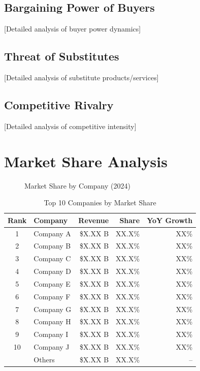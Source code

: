 \documentclass[11pt,letterpaper]{report}
\begin{document}
\subsection{Bargaining Power of Buyers}
[Detailed analysis of buyer power dynamics]

\subsection{Threat of Substitutes}
[Detailed analysis of substitute products/services]

\subsection{Competitive Rivalry}
[Detailed analysis of competitive intensity]

\section{Market Share Analysis}


\begin{figure}[htbp]
\centering
\caption{Market Share by Company (2024)}
\label{fig:market_share}
\end{figure}

\begin{table}[htbp]
\centering
\caption{Top 10 Companies by Market Share}
\begin{tabular}{@{}clrrr@{}}
\toprule
\textbf{Rank} & \textbf{Company} & \textbf{Revenue} & \textbf{Share} & \textbf{YoY Growth} \\
\midrule
1 & Company A & \$X.XX B & XX.X\% & \trendup{} XX\% \\
\rowcolor{tablealt} 2 & Company B & \$X.XX B & XX.X\% & \trendup{} XX\% \\
3 & Company C & \$X.XX B & XX.X\% & \trendflat{} XX\% \\
\rowcolor{tablealt} 4 & Company D & \$X.XX B & XX.X\% & \trendup{} XX\% \\
5 & Company E & \$X.XX B & XX.X\% & \trenddown{} XX\% \\
\rowcolor{tablealt} 6 & Company F & \$X.XX B & XX.X\% & \trendup{} XX\% \\
7 & Company G & \$X.XX B & XX.X\% & \trendup{} XX\% \\
\rowcolor{tablealt} 8 & Company H & \$X.XX B & XX.X\% & \trendflat{} XX\% \\
9 & Company I & \$X.XX B & XX.X\% & \trendup{} XX\% \\
\rowcolor{tablealt} 10 & Company J & \$X.XX B & XX.X\% & \trenddown{} XX\% \\
\midrule
& Others & \$X.XX B & XX.X\% & -- \\
\bottomrule
\end{tabular}
\label{tab:market_share}
\end{table}
\end{document}
